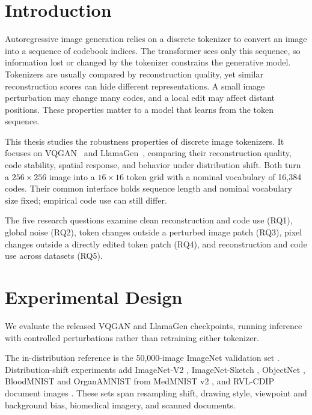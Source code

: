 \documentclass[11pt,a4paper,twocolumn]{article}
\newcommand{\llamagen}{LlamaGen}
\newcommand{\vqgan}{VQGAN}
\newcommand{\imagenet}{ImageNet}
\begin{document}


\section{Introduction}
\label{sec:motivation}

Autoregressive image generation relies on a discrete tokenizer to convert an image into a sequence of codebook indices. The transformer sees only this sequence, so information lost or changed by the tokenizer constrains the generative model. Tokenizers are usually compared by reconstruction quality, yet similar reconstruction scores can hide different representations. A small image perturbation may change many codes, and a local edit may affect distant positions. These properties matter to a model that learns from the token sequence.

This thesis studies the robustness properties of discrete image tokenizers. It focuses on \vqgan{}~\cite{esser2021taming} and \llamagen{}~\cite{sun2024llamagen}, comparing their reconstruction quality, code stability, spatial response, and behavior under distribution shift. Both turn a $256\times256$ image into a $16\times16$ token grid with a nominal vocabulary of 16,384 codes. Their common interface holds sequence length and nominal vocabulary size fixed; empirical code use can still differ.

The five research questions examine clean reconstruction and code use (RQ1),
global noise (RQ2), token changes outside a perturbed image patch (RQ3),
pixel changes outside a directly edited token patch (RQ4), and reconstruction
and code use across datasets (RQ5).

\section{Experimental Design}
\label{sec:design}

We evaluate the released \vqgan{} and \llamagen{} checkpoints, running inference with controlled perturbations rather than retraining either tokenizer.

The in-distribution reference is the 50,000-image \imagenet{} validation set \cite{deng2009imagenet}. Distribution-shift experiments add ImageNet-V2 \cite{recht2019imagenet}, ImageNet-Sketch \cite{wang2019learning}, ObjectNet \cite{barbu2019objectnet}, BloodMNIST and OrganAMNIST from MedMNIST v2 \cite{yang2023medmnist}, and RVL-CDIP document images \cite{harley2015rvlcdip}. These sets span resampling shift, drawing style, viewpoint and background bias, biomedical imagery, and scanned documents.
\end{document}
